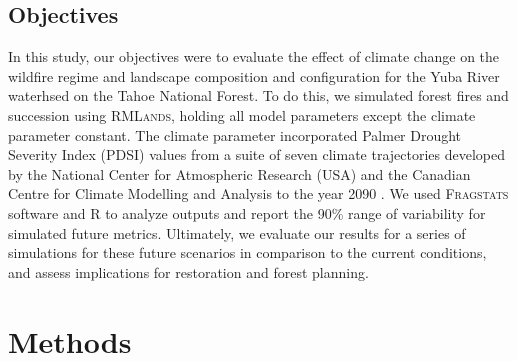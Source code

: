 \subsection{Objectives}
In this study, our objectives were to evaluate the effect of climate change on the wildfire regime and landscape composition and configuration for the Yuba River waterhsed on the Tahoe National Forest. To do this, we simulated forest fires and succession using \textsc{RMLands}, holding all model parameters except the climate parameter constant. The climate parameter incorporated Palmer Drought Severity Index (PDSI) values from a suite of seven climate trajectories developed by the National Center for Atmospheric Research (USA) and the Canadian Centre for Climate Modelling and Analysis to the year 2090 \citep{Cook2014}. We used \textsc{Fragstats} software and R to analyze outputs and report the 90\% range of variability for simulated future metrics. Ultimately, we evaluate our results for a series of simulations for these future scenarios in comparison to the current conditions, and assess implications for restoration and forest planning.


















\section{Methods}


